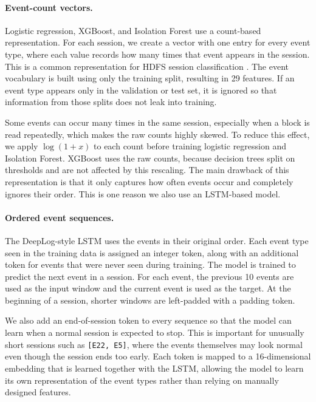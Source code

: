 \documentclass[11pt]{article}
\begin{document}
\paragraph{Event-count vectors.} Logistic regression, XGBoost, and Isolation Forest use a count-based representation. For each session, we create a vector with one entry for every event type, where each value records how many times that event appears in the session. This is a common representation for HDFS session classification \citep{He2016}. The event vocabulary is built using only the training split, resulting in 29 features. If an event type appears only in the validation or test set, it is ignored so that information from those splits does not leak into training.

Some events can occur many times in the same session, especially when a block is read repeatedly, which makes the raw counts highly skewed. To reduce this effect, we apply $\log(1+x)$ to each count before training logistic regression and Isolation Forest. XGBoost uses the raw counts, because decision trees split on thresholds and are not affected by this rescaling. The main drawback of this representation is that it only captures how often events occur and completely ignores their order. This is one reason we also use an LSTM-based model.

\paragraph{Ordered event sequences.} The DeepLog-style LSTM \citep{Du2017deeplog} uses the events in their original order. Each event type seen in the training data is assigned an integer token, along with an additional token for events that were never seen during training. The model is trained to predict the next event in a session. For each event, the previous 10 events are used as the input window and the current event is used as the target. At the beginning of a session, shorter windows are left-padded with a padding token.

We also add an end-of-session token to every sequence so that the model can learn when a normal session is expected to stop. This is important for unusually short sessions such as \texttt{[E22, E5]}, where the events themselves may look normal even though the session ends too early. Each token is mapped to a 16-dimensional embedding that is learned together with the LSTM, allowing the model to learn its own representation of the event types rather than relying on manually designed features.
\end{document}
